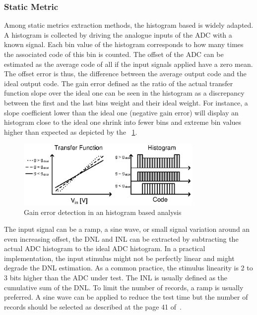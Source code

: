    \subsubsection{Static Metric}
Among static metrics extraction methods, the histogram based is widely adapted. A histogram is collected by driving the analogue inputs of the ADC with a known signal. Each bin value of the histogram corresponds to how many times the associated code of this bin is counted. The offset of the ADC can be estimated as the average code of all if the input signals applied have a zero mean. The offset error is thus, the difference between the average output code and the ideal output code. The gain error defined as the ratio of the actual transfer function slope over the ideal one can be seen in the histogram as a discrepancy between the first and the last bins weight and their ideal weight. For instance, a slope coefficient lower than the ideal one (negative gain error) will display an histogram close to the ideal one shrink into fewer bins and extreme bin values higher than expected as depicted by the \figurename~\ref{fig:gain-error-hist}.

\begin{figure}[htp]
    \centering
    \includegraphics[width=0.8\textwidth]{Chapter5/Figs/sar_test/histogram_gain_error.ps}
    \caption{Gain error detection in an histogram based analysis}
    \label{fig:gain-error-hist}
\end{figure}

The input signal can be a ramp, a sine wave, or small signal variation around an even increasing offset, the DNL and INL can be extracted by subtracting the actual ADC histogram to the ideal ADC histogram. In a practical implementation, the input stimulus might not be perfectly linear and might degrade the DNL estimation. As a common practice, the stimulus linearity is 2 to 3 bits higher than the ADC under test. The INL is usually defined as the cumulative sum of the DNL\@. To limit the number of records, a ramp is usually preferred. A sine wave can be applied to reduce the test time but the number of records should be selected as described at the page 41 of~\cite{IEEESTD1241-2010}.

